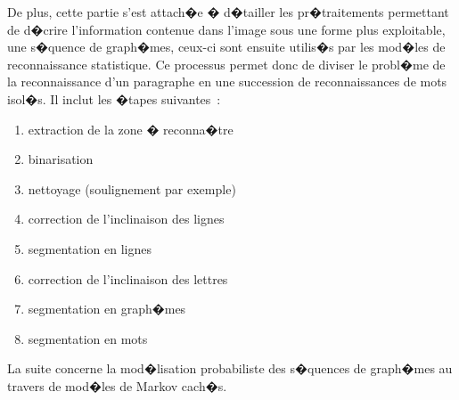 De plus, cette partie s'est attach�e � d�tailler les pr�traitements permettant de d�crire l'information contenue dans l'image sous une forme plus exploitable, une s�quence de graph�mes, ceux-ci sont ensuite utilis�s par les mod�les de reconnaissance statistique. Ce processus permet donc de diviser le probl�me de la reconnaissance d'un paragraphe en une succession de reconnaissances de mots isol�s. Il inclut les �tapes suivantes~:
        
            \begin{enumerate}
            \item extraction de la zone � reconna�tre
            \item binarisation
            \item nettoyage (soulignement par exemple)
            \item correction de l'inclinaison des lignes
            \item segmentation en lignes
            \item correction de l'inclinaison des lettres
            \item segmentation en graph�mes
            \item segmentation en mots
            \end{enumerate}


La suite concerne la mod�lisation probabiliste des s�quences de graph�mes au travers de mod�les de Markov cach�s.










\newpage




%
%
